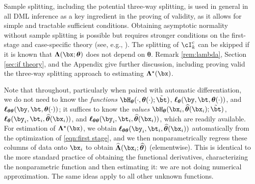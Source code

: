 \documentclass[12pt]{article}
\numberwithin{equation}{section}
\theoremstyle{definition}
\newcommand{\btheta}{\boldsymbol{\theta}}
\newcommand{\bL}{\boldsymbol{\Lambda}}
\newcommand{\bLtrue}{\bL^\star}
\newcommand{\btstar}{\tilde{\bt}}
\newcommand{\bthat}{\bm{\widehat{\theta}}}
\newcommand{\bLhat}{\widehat{\bL}}
\begin{document}
Sample splitting, including the potential three-way splitting, is used in general in all DML inference as a key ingredient in the proving of validity, as it allows for simple and tractable sufficient conditions. Obtaining asymptotic normality without sample splitting is possible but requires stronger conditions on the first-stage and case-specific theory (see, e.g., \cite{Newey1994_Ecma,Cattaneo2010_JoE,Cattaneo-Farrell2011_chapter,Farrell2015_arXiv,Chen-Syrgkanis-Austern2022_NIPS}). The splitting of $\cI_k^c$ can be skipped if it is known that $\bL(\bx; \btheta)$ does not depend on $\btheta$. Remark \ref{rem:lambda}, Section \ref{sec:if theory}, and the Appendix give further discussion, including proving valid the three-way splitting approach to estimating $\bLtrue(\bx)$. 

Note that throughout, particularly when paired with automatic differentiation, we do not need to know the \emph{functions} $\bH_{\btheta}(\cdot, \btheta(\cdot); \btstar)$, $\bm{\ell}_{\btheta}(\by, \bt, \btheta(\cdot))$, and $\bm{\ell}_{\btheta\btheta}(\by, \bt, \btheta(\cdot))$; it suffices to know the \emph{values} $\bH_{\btheta}(\bx_i, \bthat(\bx_i); \btstar)$, $\bm{\ell}_{\btheta}(\by_i, \bt_i, \bthat(\bx_i))$, and $\bm{\ell}_{\btheta\btheta}(\by_i, \bt_i, \bthat(\bx_i))$, which are readily available. For estimation of $\bLtrue(\bx)$, we obtain $\bm{\ell}_{\btheta\btheta}(\by_i, \bt_i, \bthat(\bx_i))$ automatically from the optimization of \eqref{eqn:first stage}, and we then nonparametrically regress these columns of data onto $\bx_i$ to obtain $\bLhat(\bx_i; \bthat)$ (elementwise). This is identical to the more standard practice of obtaining the functional derivatives, characterizing the nonparametric function and then estimating it: we are not doing numerical approximation. The same ideas apply to all other unknown functions. 
\end{document}
